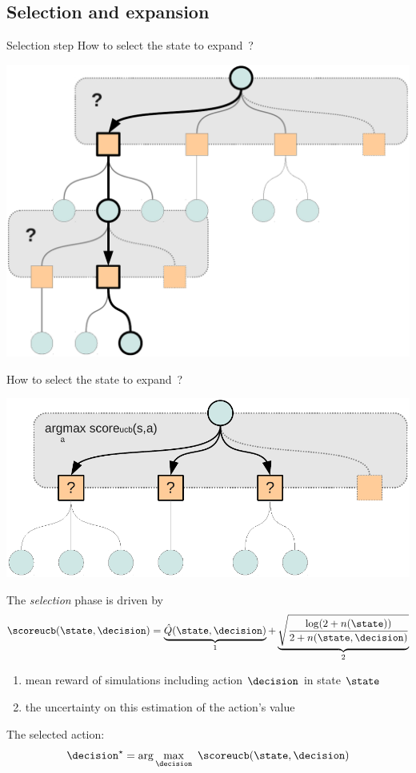 \subsection{Selection and expansion}

\begin{frame}{Selection step}
    How to select the state to expand~?
    \begin{center}
        \includegraphics[width=.80\linewidth]{fig/tree3}
    \end{center}
\end{frame}


\begin{frame}{How to select the state to expand~?}
    \begin{center}
        \includegraphics[width=.40\linewidth]{fig/tree4}
    \end{center}
    The {\em selection} phase is driven by \ucb{}%
    $$
    \scoreucb(\state, \decision) = \underbrace{\hat{Q}(\state,\decision)}_\text{1} + \underbrace{\sqrt{ \frac{\log(2 + n(\state))}{2 + n(\state, \decision)} }}_\text{2}
    $$
     {
        \begin{enumerate}
            \item mean reward of simulations including action $\decision$ in state $\state$
            \item the uncertainty on this estimation of the action’s value
        \end{enumerate}
    }
     {
        The selected action: $$\decision^\star = \arg\max_{\decision} ~ \scoreucb(\state, \decision)$$
        ~\\
    }
    ~\\
\end{frame}


